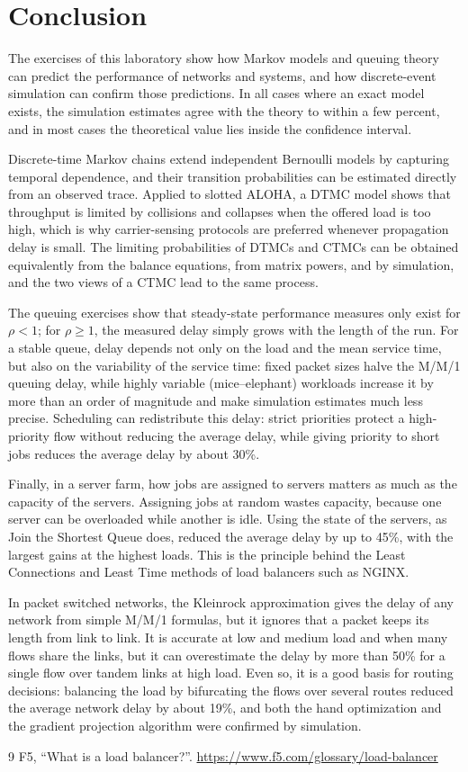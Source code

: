 ﻿\documentclass[12pt]{article}
\begin{document}
\section{Conclusion}

The exercises of this laboratory show how Markov models and queuing theory can predict the performance of networks and systems, and how discrete-event simulation can confirm those predictions. In all cases where an exact model exists, the simulation estimates agree with the theory to within a few percent, and in most cases the theoretical value lies inside the confidence interval.

Discrete-time Markov chains extend independent Bernoulli models by capturing temporal dependence, and their transition probabilities can be estimated directly from an observed trace. Applied to slotted ALOHA, a DTMC model shows that throughput is limited by collisions and collapses when the offered load is too high, which is why carrier-sensing protocols are preferred whenever propagation delay is small. The limiting probabilities of DTMCs and CTMCs can be obtained equivalently from the balance equations, from matrix powers, and by simulation, and the two views of a CTMC lead to the same process.

The queuing exercises show that steady-state performance measures only exist for $\rho<1$; for $\rho\ge1$, the measured delay simply grows with the length of the run. For a stable queue, delay depends not only on the load and the mean service time, but also on the variability of the service time: fixed packet sizes halve the M/M/1 queuing delay, while highly variable (mice--elephant) workloads increase it by more than an order of magnitude and make simulation estimates much less precise. Scheduling can redistribute this delay: strict priorities protect a high-priority flow without reducing the average delay, while giving priority to short jobs reduces the average delay by about 30\%.

Finally, in a server farm, how jobs are assigned to servers matters as much as the capacity of the servers. Assigning jobs at random wastes capacity, because one server can be overloaded while another is idle. Using the state of the servers, as Join the Shortest Queue does, reduced the average delay by up to 45\%, with the largest gains at the highest loads. This is the principle behind the Least Connections and Least Time methods of load balancers such as NGINX.

In packet switched networks, the Kleinrock approximation gives the delay of any network from simple M/M/1 formulas, but it ignores that a packet keeps its length from link to link. It is accurate at low and medium load and when many flows share the links, but it can overestimate the delay by more than 50\% for a single flow over tandem links at high load. Even so, it is a good basis for routing decisions: balancing the load by bifurcating the flows over several routes reduced the average network delay by about 19\%, and both the hand optimization and the gradient projection algorithm were confirmed by simulation.

\begin{thebibliography}{9}
     F5, ``What is a load balancer?''. \url{https://www.f5.com/glossary/load-balancer}
\end{thebibliography}
\end{document}
